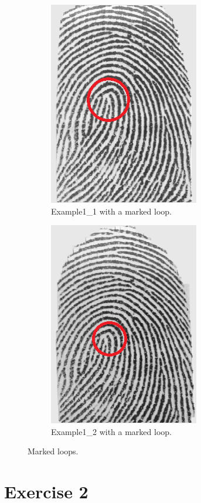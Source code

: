 \documentclass[a4paper]{article}
\begin{document}
\begin{figure}[H]
  \centering
       \begin{subfigure}[t]{0.45\textwidth}
         \centering
         \includegraphics[scale=0.6]{Figures/example1_marked}
         \caption{Example1\_1 with a marked loop.}
     \end{subfigure}%
     \quad
     \begin{subfigure}[t]{0.45\textwidth}
         \centering
         \includegraphics[scale=0.6]{Figures/example2_marked}
         \caption{Example1\_2 with a marked loop.}
     \end{subfigure}
    \caption{Marked loops.}
    \label{fig:ex1b}
\end{figure}

\section{Exercise 2}
\end{document}
